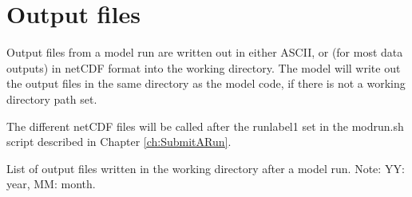 \chapter{Output files}
\label{ch:output}



Output files from a model run are written out in either ASCII, or
(for most data outputs) in netCDF format into the working directory. 
The model will write out the output files in the same directory as the model 
code, if there is not a working directory path set. 


The different netCDF files will be called after the runlabel1 set in the modrun.sh script 
described in Chapter \ref{ch:SubmitARun}.


\begin{table}
\caption[List of model output files]{List of output files written in the
  working directory after a  model run. 
Note: YY: year, MM: month.}\label{tab:output}
\vspace{1cm}


\end{table}

